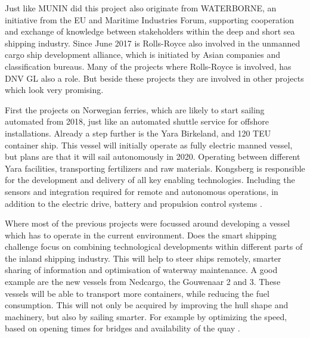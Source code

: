 Just like MUNIN did this project also originate from WATERBORNE, an initiative from the EU and Maritime Industries Forum, supporting cooperation and exchange of knowledge between stakeholders within the deep and short sea shipping industry. Since June 2017 is Rolls-Royce also involved in the unmanned cargo ship development alliance, which is initiated by Asian companies and classification bureaus. Many of the projects where Rolls-Royce is involved, has DNV GL also a role. But beside these projects they are involved in other projects which look very promising.

First the projects on Norwegian ferries, which are likely to start sailing automated from 2018, just like an automated shuttle service for offshore installations. 
Already a step further is the Yara Birkeland, and 120 \ac{TEU} container ship. This vessel will initially operate as fully electric manned vessel, but plans are that it will sail autonomously in 2020. Operating between different Yara facilities, transporting fertilizers and raw materials. 
Kongsberg is responsible for the development and delivery of all key enabling technologies. Including the sensors and integration required for remote and autonomous operations, in addition to the electric drive, battery and propulsion control systems \cite{Sames2017}.

Where most of the previous projects were focussed around developing a vessel which has to operate in the current environment. Does the smart shipping challenge focus on combining technological developments within different parts of the inland shipping industry. This will help to steer ships remotely, smarter sharing of information and optimisation of waterway maintenance.
A good example are the new vessels from Nedcargo, the Gouwenaar 2 and 3. These vessels will be able to transport more containers, while reducing the fuel consumption. This will not only be acquired by improving the hull shape and machinery, but also by sailing smarter. For example by optimizing the speed, based on opening times for bridges and availability of the quay \cite{SMASH2017}. 


